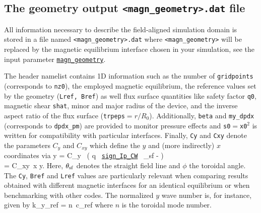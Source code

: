 \documentclass[12pt]{article}
\begin{document}
\subsection{The geometry output \texttt{<magn\_geometry>.dat} file}
\label{subsec:geometry-file}

All information necessary to describe the field-aligned simulation domain is stored in a file
named \texttt{<magn\_geometry>.dat} where {\tt <magn\_geometry>} will be replaced by the
magnetic equilibrium interface chosen in your simulation, see the input parameter
\hyperlink{magn_geometry}{\tt magn\_geometry}.

The header namelist contains 1D information such as the number of {\tt gridpoints} (corresponds to {\tt nz0}),
the employed magnetic equilibrium, the reference values set by the geometry ({\tt Lref, Bref})
as well flux surface quantities like safety factor {\tt q0}, magnetic shear {\tt shat},
minor and major radius of the device, and the inverse aspect ratio of the flux surface ({\tt trpeps}$=r/R_0$).
Additionally, {\tt beta} and {\tt my\_dpdx}
(corresponds to {\tt dpdx\_pm}) are provided to monitor pressure effects and {\tt s0}$=${\tt x0}$^2$ is
written for compatibility with particular interfaces.
Finally, {\tt Cy} and {\tt Cxy} denote the parameters $C_y$ and $C_{xy}$ which define the $y$ and
(more indirectly) $x$ coordinates via
\bea
y = C_y \, \left( q \, \hyperlink{sign_Ip_CW}{\tt sign\_Ip\_CW} \, \theta_{\rm sf} - \phi\right)\\
 = C_{xy}\, \nabla x \times \nabla y.
\eea
Here, $\theta_{\rm sf}$ denotes the straight field line and $\phi$ the toroidal angle. The {\tt Cy}, {\tt Bref} and {\tt Lref} values are particularly relevant when comparing \gene results
obtained with different magnetic interfaces for an identical equilibrium or when benchmarking with other codes.
The normalized $y$ wave number is, for instance, given by
\bea
k_y\rho_{\rm ref} = n\, c_{\rm ref} 
\eea
where $n$ is the toroidal mode number.
\end{document}
